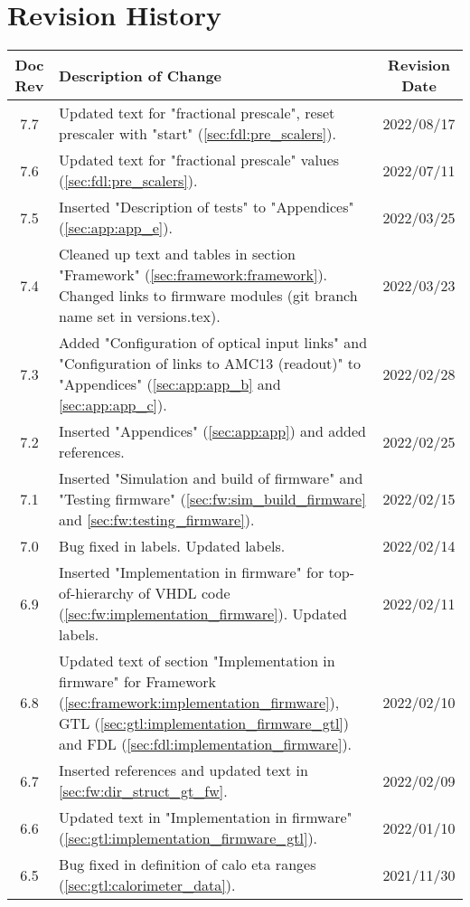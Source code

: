 \section*{Revision History}
\label{sec:revision_history}

\begin{longtable}{|c|p{}|c|}
\hline
Doc Rev & Description of Change & Revision Date\\
\hline
\hline
\endhead
7.7 & Updated text for "fractional prescale", reset prescaler with "start" (\ref{sec:fdl:pre_scalers}). & 2022/08/17\\
7.6 & Updated text for "fractional prescale" values (\ref{sec:fdl:pre_scalers}). & 2022/07/11\\
7.5 & Inserted "Description of tests" to "Appendices" (\ref{sec:app:app_e}). & 2022/03/25\\
7.4 & Cleaned up text and tables in section "Framework" (\ref{sec:framework:framework}). Changed links to firmware modules (git branch name set in versions.tex). & 2022/03/23\\
7.3 & Added "Configuration of optical input links" and "Configuration of links to AMC13 (readout)" to "Appendices" (\ref{sec:app:app_b} and \ref{sec:app:app_c}). & 2022/02/28\\
7.2 & Inserted "Appendices" (\ref{sec:app:app}) and added references. & 2022/02/25\\
7.1 & Inserted "Simulation and build of firmware" and "Testing firmware" (\ref{sec:fw:sim_build_firmware} and \ref{sec:fw:testing_firmware}). & 2022/02/15\\
7.0 & Bug fixed in labels. Updated labels. & 2022/02/14\\
6.9 & Inserted "Implementation in firmware" for top-of-hierarchy of VHDL code (\ref{sec:fw:implementation_firmware}). Updated labels. & 2022/02/11\\
6.8 & Updated text of section "Implementation in firmware" for Framework (\ref{sec:framework:implementation_firmware}), GTL (\ref{sec:gtl:implementation_firmware_gtl}) and FDL (\ref{sec:fdl:implementation_firmware}). & 2022/02/10\\
6.7 & Inserted references and updated text in \ref{sec:fw:dir_struct_gt_fw}. & 2022/02/09\\
6.6 & Updated text in "Implementation in firmware" (\ref{sec:gtl:implementation_firmware_gtl}). & 2022/01/10\\
6.5 & Bug fixed in definition of calo eta ranges (\ref{sec:gtl:calorimeter_data}). & 2021/11/30\\

\end{longtable}
